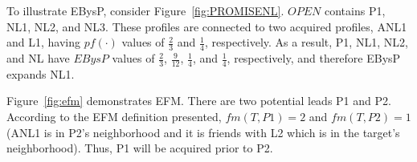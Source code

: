 \documentclass[prodmode,acmtecs]{acmsmall} %
\newcommand{\note}[2]{\textbf{\textsc{#1} says: \textit{#2}}}
\begin{document}



To illustrate  EBysP, consider Figure~\ref{fig:PROMISENL}. $OPEN$ contains P1,
NL1, NL2, and NL3. These profiles are connected to two acquired profiles, ANL1
and L1, having $pf(\cdot)$ values of $\frac{2}{3}$ and $\frac{1}{4}$, respectively. As a result, P1, NL1, NL2, and NL have $EBysP$ values of
$\frac{2}{3}$, $\frac{9}{12}$, $\frac{1}{4}$, and $\frac{1}{4}$, respectively, and therefore EBysP expands NL1.







Figure~\ref{fig:efm} demonstrates EFM. There are two potential leads P1 and P2. According to the EFM definition presented, $fm(T,P1)=2$ and  $fm(T,P2)=1$ (ANL1 is in P2's neighborhood and it is friends with L2 which is in the target's neighborhood). Thus, P1 will be acquired prior to P2.

\end{document}
